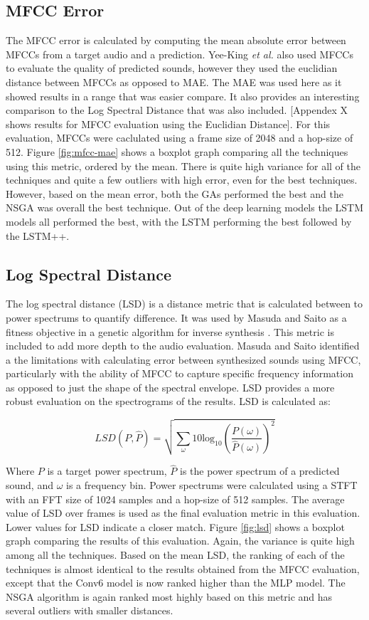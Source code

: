 \subsection{MFCC Error}
The MFCC error is calculated by computing the mean absolute error between MFCCs from a target audio and a prediction. Yee-King \textit{et al.} \cite{yee2018automatic} also used MFCCs to evaluate the quality of predicted sounds, however they used the euclidian distance between MFCCs as opposed to MAE. The MAE was used here as it showed results in a range that was easier compare. It also provides an interesting comparison to the Log Spectral Distance that was also included. [Appendex X shows results for MFCC evaluation using the Euclidian Distance]. For this evaluation, MFCCs were caclulated using a frame size of 2048 and a hop-size of 512. Figure \ref{fig:mfcc-mae} shows a boxplot graph comparing all the techniques using this metric, ordered by the mean. There is quite high variance for all of the techniques and quite a few outliers with high error, even for the best techniques. However, based on the mean error, both the GAs performed the best and the NSGA was overall the best technique. Out of the deep learning models the LSTM models all performed the best, with the LSTM performing the best followed by the LSTM++.

\subsection{Log Spectral Distance}
The log spectral distance (LSD) is a distance metric that is calculated between to power spectrums to quantify difference. It was used by Masuda and Saito as a fitness objective in a genetic algorithm for inverse synthesis \cite{masudo2021quality}. This metric is included to add more depth to the audio evaluation. Masuda and Saito identified a the limitations with calculating error between synthesized sounds using MFCC, particularly with the ability of MFCC to capture specific frequency information as opposed to just the shape of the spectral envelope. LSD provides a more robust evaluation on the spectrograms of the results.  LSD is calculated as:

\begin{equation}
    LSD(P, \hat{P}) = \sqrt{\sum_{\omega}10\text{log}_{10}\left( \frac{P(\omega)}{\hat{P}(\omega)} \right)^2}
\end{equation}

Where $P$ is a target power spectrum, $\hat{P}$ is the power spectrum of a predicted sound, and $\omega$ is a frequency bin. Power spectrums were calculated using a STFT with an FFT size of 1024 samples and a hop-size of 512 samples. The average value of LSD over frames is used as the final evaluation metric in this evaluation. Lower values for LSD indicate a closer match. Figure \ref{fig:lsd} shows a boxplot graph comparing the results of this evaluation. Again, the variance is quite high among all the techniques. Based on the mean LSD, the ranking of each of the techniques is almost identical to the results obtained from the MFCC evaluation, except that the Conv6 model is now ranked higher than the MLP model. The NSGA algorithm is again ranked most highly based on this metric and has several outliers with smaller distances.

